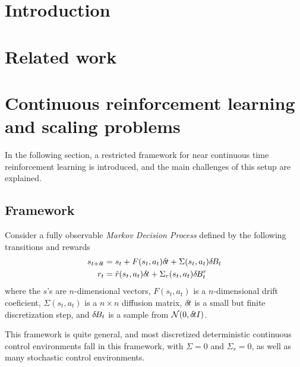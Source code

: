 \documentclass{article}
\begin{document}

\begin{abstract}

\end{abstract}

\section{Introduction}
\label{sec:intro}

\section{Related work}
\label{sec:related}
\cite{adv_upd}
\cite{adv_learn}
\cite{dueling_nets}

\section{Continuous reinforcement learning and scaling problems}
\label{sec:continous}
In the following section, a restricted framework for near continuous
time reinforcement learning is introduced, and the main challenges of this
setup are explained. 

\subsection{Framework}
Consider a fully observable \emph{Markov Decision Process} defined by the following
transitions and rewards
\begin{align}
	s_{t + \delta\hspace{-.1em}t} &= s_t + F(s_t, a_t) \delta\hspace{-.1em}t + \Sigma(s_t, a_t) \delta\hspace{-.1em}B_t\\
	r_{t} &= \tilde{r}(s_t, a_t) \delta\hspace{-.1em}t + \Sigma_r(s_t, a_t) \delta\hspace{-.1em}B_t^r
\end{align}
where the $s$'s are $n$-dimensional vectors, $F(s_t, a_t)$ is a $n$-dimensional
drift coeficient, $\Sigma(s_t, a_t)$ is a $n \times n$ diffusion matrix,
$\delta\hspace{-.1em}t$ is a small but finite discretization step, and $\delta\hspace{-.1em}B_t$ is a sample
from $\mathcal{N}(0, \delta\hspace{-.1em}t I)$.

This framework is quite general, and most discretized deterministic continuous
control environments fall in this framework, with $\Sigma = 0$ and $\Sigma_r =
0$, as well as many stochastic control environments.
\end{document}
